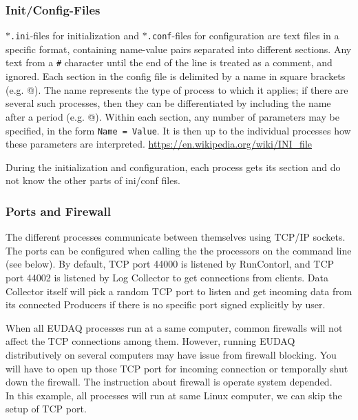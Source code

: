 \subsubsection{Init/Config-Files}\label{sec:ConfigFiles}
\texttt{$\ast$.ini}-files for initialization and \texttt{$\ast$.conf}-files for configuration
are text files in a specific format, containing name-value pairs separated into different sections.
Any text from a \texttt{\#} character until the end of the line is treated as a comment, and
ignored.  
Each section in the config file is delimited by a name in square brackets
(e.g. \verb@[RunControl]@).  
The name represents the type of process to which it applies; if there
are several such processes, then they can be differentiated by including the name after a period
(e.g. @).  
Within each section, any number of parameters may be specified,
in the form \mbox{\texttt{Name = Value}}.  
It is then up to the individual processes how these parameters are interpreted.
\url{https://en.wikipedia.org/wiki/INI\_file}

During the initialization and configuration, each process gets its section and do not know the other parts of ini/conf files.


\subsubsection{Ports and Firewall}
The different processes communicate between themselves using TCP/IP sockets. The ports can be configured when calling the the processors on the command line (see below). By default, TCP port 44000 is listened by RunContorl, and TCP port 44002 is listened by Log Collector to get connections from clients. Data Collector itself will pick a random TCP port to listen and get incoming data from its connected Producers if there is no specific port signed explicitly by user.

When all EUDAQ processes run at a same computer, common firewalls will not affect the TCP connections among them. However, running EUDAQ distributively on several computers may have issue from firewall blocking. You will have to open up those TCP port for incoming connection or temporally shut down the firewall. The instruction about firewall is operate system depended.\\

In this example, all processes will run at same Linux computer, we can skip the setup of TCP port.

